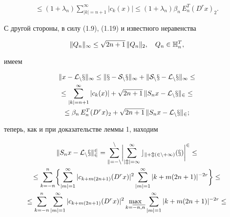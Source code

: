 \begin{pf}
\begin{gather}
%


\le (1+\lambda_n)\sum_{|k|=n+1}^\infty |c_k(x)|\le


(1+\lambda_n)\beta_n\, E_n^T(D^rx)_2 .


\end{gather}


С другой стороны, в силу (1.9), (1.19) и известного неравенства


$$


\|Q_n\|_\infty \le \sqrt{2n+1}\, \|Q_n\|_2,\quad


Q_n\in \Bbb{H}_n^T,


$$


имеем


\begin{gather}


\|x-\cal{L}_nx\|_\infty \le \|x-S_nx\|_\infty +


\|S_nx-\cal{L}_nx\|_\infty \le\notag\\


%


\le \sum_{|k|=n+1}^\infty |c_k(x)| + \sqrt{2n+1}\,


\|S_nx-\cal{L}_nx\|_2 \le\notag\\


%


\le \beta_n\, E_n^T(D^rx)_2 +\sqrt{2n+1}\,


\|S_nx-\cal{L}_nx\|_2 ;


\end{gather}


теперь, как и при доказательстве леммы 1, находим


\begin{gather}


\|S_nx-\cal{L}_nx\|_2^2=\sum_{k=-n}^n\biggl|


\sum_{|m|=1}^\infty c_{k+m(2n+1)}(x)\biggr|^2\le\notag\\


%


\le \sum_{k=-n}^n\biggl\{ \sum_{|m|=1}^\infty |c_{k+m(2n+1)}(D^rx)|^2


\sum_{|m|=1}^\infty |k+m(2n+1)|^{-2r}\biggr\} \le\notag\\


%


\le \sum_{k=-n}^n \sum_{|m|=1}^\infty |c_{k+m(2n+1)}(D^rx)|^2


\max_{k=\overline{-n,n}}\sum_{|m|=1}^\infty |k+m(2n+1)|^{-2r} \le\notag\\


%



\end{gather}
\end{pf}
